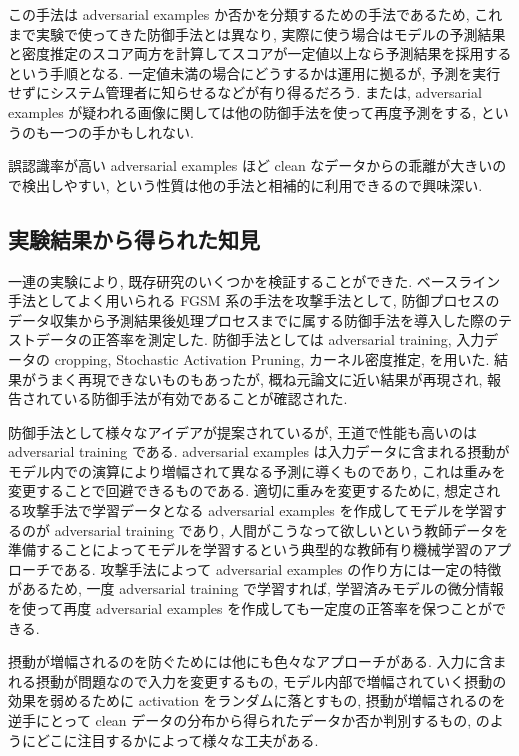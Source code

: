この手法は adversarial examples か否かを分類するための手法であるため, これまで実験で使ってきた防御手法とは異なり, 実際に使う場合はモデルの予測結果と密度推定のスコア両方を計算してスコアが一定値以上なら予測結果を採用するという手順となる.
一定値未満の場合にどうするかは運用に拠るが, 予測を実行せずにシステム管理者に知らせるなどが有り得るだろう.
または, adversarial examples が疑われる画像に関しては他の防御手法を使って再度予測をする, というのも一つの手かもしれない.

誤認識率が高い adversarial examples ほど clean なデータからの乖離が大きいので検出しやすい, という性質は他の手法と相補的に利用できるので興味深い.



\subsection{実験結果から得られた知見}
\label{subsec:exp-summary}
一連の実験により, 既存研究のいくつかを検証することができた.
ベースライン手法としてよく用いられる FGSM 系の手法を攻撃手法として, 防御プロセスのデータ収集から予測結果後処理プロセスまでに属する防御手法を導入した際のテストデータの正答率を測定した.
防御手法としては adversarial training, 入力データの cropping, Stochastic Activation Pruning, カーネル密度推定, を用いた.
結果がうまく再現できないものもあったが, 概ね元論文に近い結果が再現され, 報告されている防御手法が有効であることが確認された.

防御手法として様々なアイデアが提案されているが, 王道で性能も高いのは adversarial training である.
adversarial examples は入力データに含まれる摂動がモデル内での演算により増幅されて異なる予測に導くものであり, これは重みを変更することで回避できるものである.
適切に重みを変更するために, 想定される攻撃手法で学習データとなる adversarial examples を作成してモデルを学習するのが adversarial training であり, 人間がこうなって欲しいという教師データを準備することによってモデルを学習するという典型的な教師有り機械学習のアプローチである.
攻撃手法によって adversarial examples の作り方には一定の特徴があるため, 一度 adversarial training で学習すれば, 学習済みモデルの微分情報を使って再度 adversarial examples を作成しても一定度の正答率を保つことができる.

摂動が増幅されるのを防ぐためには他にも色々なアプローチがある.
入力に含まれる摂動が問題なので入力を変更するもの, モデル内部で増幅されていく摂動の効果を弱めるために activation をランダムに落とすもの, 摂動が増幅されるのを逆手にとって clean データの分布から得られたデータか否か判別するもの, のようにどこに注目するかによって様々な工夫がある.

